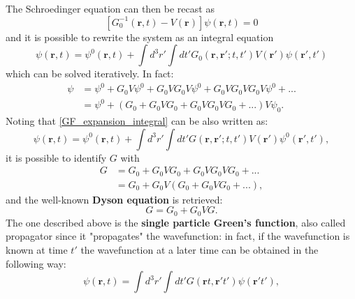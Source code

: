 The Schroedinger equation can then be recast as
\begin{equation}
    \left[G^{-1}_0(\mathbf{r},t)-V(\mathbf{r})\right]\psi(\mathbf{r},t)=0
\end{equation}
and it is possible to rewrite the system as an integral equation
\begin{equation}
    \psi(\mathbf{r},t)=\psi^0(\mathbf{r},t)+\int d^3r'\int dt' G_0(\mathbf{r},\mathbf{r}';t,t')V(\mathbf{r}')\psi(\mathbf{r}',t')
    \label{GF_expansion_integral}
\end{equation}
which can be solved iteratively. In fact:
\begin{equation}
\begin{split}
    \psi&= \psi^0+G_0V\psi^0+G_0VG_0V\psi^0+G_0VG_0VG_0V\psi^0+...\\
    &= \psi^0+(G_0+G_0VG_0+G_0VG_0VG_0+...)V\psi_0.
\end{split}
\label{expansion_G}
\end{equation}
Noting that \ref{GF_expansion_integral} can be also written as:
\begin{equation}
    \psi(\mathbf{r},t)=\psi^0(\mathbf{r},t)+\int d^3r'\int dt' G(\mathbf{r},\mathbf{r}';t,t')V(\mathbf{r}')\psi^0(\mathbf{r}',t'),
\end{equation}
it is possible to identify $G$ with
\begin{equation}
\begin{split}
    G&=G_0+G_0VG_0+G_0VG_0VG_0+...\\
    &=G_0+G_0V(G_0+G_0VG_0+...),
\end{split}
\end{equation}
and the well-known \textbf{Dyson equation} is retrieved:
\begin{equation}
    G=G_0+G_0VG.
    \label{Dyson_Eq}
\end{equation}
The one described above is the \textbf{single particle Green's function}, also called propagator since it "propagates" the wavefunction: in fact,
if the wavefunction is known at time $t'$ the wavefunction at a later time can be obtained in the following way:
\begin{equation}
    \psi(\mathbf{r},t)=\int d^3r'\int dt' G(\mathbf{r}t,\mathbf{r}'t')\psi(\mathbf{r}'t'),
\end{equation}

